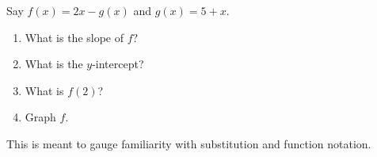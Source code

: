 \documentclass[noauthor,noinstructornotes]{ximera}
\begin{document}
\begin{problem}
Say \(f(x) = 2x - g(x)\) and \(g(x) = 5 + x\).

\begin{enumerate}
    \item What is the slope of \(f\)?
    \item What is the \(y\)-intercept?
    \item What is \(f(2)\)?
    \item Graph \(f\).
\end{enumerate}

\begin{instructorNotes}
This is meant to gauge familiarity with substitution and function notation.
\end{instructorNotes}
\end{problem}
\end{document}
